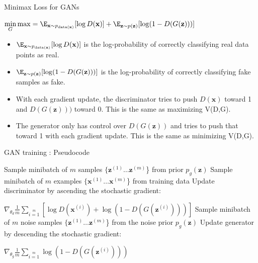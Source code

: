 \documentclass[11pt,compress,t,notes=noshow, xcolor=table]{beamer}
\begin{document}
\begin{frame} {Minimax Loss for GANs}
  \begin{tcolorbox}
    $\min \limits_G \max  %
    = \E_{\mathbf{x}\sim p_{\text{data}(\mathbf{x})}}[\log D(\mathbf{x})] + \E_{\mathbf{z}\sim p(\mathbf{z})}[\log (1 - D(G(\mathbf{z})))]$
  \end{tcolorbox}
  \begin{itemize}
    \item $\E_{\mathbf{x}\sim p_{\text{data}(\mathbf{x})}}[\log D(\mathbf{x})]$ is the log-probability of correctly classifying real data points as real. 
  \vspace{2mm}
    \item $\E_{\mathbf{z}\sim p(\mathbf{z})}[\log (1 - D(G(\mathbf{z})))]$ is the log-probability of correctly classifying fake samples as fake.
  \vspace{2mm}
    \item With each gradient update, the discriminator tries to push $D(\mathbf{x})$ toward 1 and $D(G(\mathbf{z})))$ toward 0. This is the same as maximizing V(D,G).
  \vspace{2mm}
    \item The generator  only has control over $D(G(\mathbf{z}))$ and tries to push that toward 1 with each gradient update. This is the same as minimizing V(D,G).
  \end{itemize}
\end{frame}

\begin{frame} {GAN training : Pseudocode}
  \begin{algorithm}[H]
  \footnotesize
    \caption{Minibatch stochastic gradient descent training of GANs. Amount of training iterations, amount of discriminator updates $k$ }
    \begin{algorithmic}[1]
          \State Sample minibatch of $m$ samples $\{\mathbf{z}^{(1)} \ldots \mathbf{z}^{(m)}$\} from  prior $p_g(\mathbf{z})$
          \State Sample minibatch of $m$ examples $\{\mathbf{x}^{(1)} \ldots \mathbf{x}^{(m)}$\} from  training data 
          \State Update discriminator by ascending the stochastic gradient: \item[]
  \hspace{2.5 cm}          $\nabla_{{\theta}_d} \frac {1}{m} \sum \limits_{i=1} \limits^{m} \left [ \log D(\mathbf{x}^{(i)}) + \log (1 - D(G(\mathbf{z}^{(i)}))) \right]$
        \EndFor
        \State Sample minibatch of $m$ noise samples $\{\mathbf{z}^{(1)} \ldots \mathbf{z}^{(m)}$\} from the noise prior $p_g(\mathbf{z})$
        \State Update generator by descending the stochastic gradient: \item[]
   \hspace{2.5 cm}       $\nabla_{{\theta}_g} \frac {1}{m} \sum \limits_{i=1} \limits^{m} \log (1 - D(G(\mathbf{z}^{(i)})))$
      \EndFor
    \end{algorithmic}
  \end{algorithm}
\end{frame}
\end{document}
